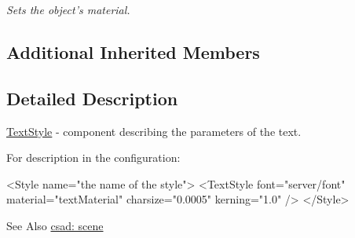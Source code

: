 \begin{DoxyCompactItemize}
\begin{DoxyCompactList}\small\item\em Sets the object's material. \end{DoxyCompactList}\end{DoxyCompactItemize}
\subsection*{Additional Inherited Members}


\subsection{Detailed Description}
\hyperlink{classcsad_1_1_text_style}{Text\-Style} -\/ component describing the parameters of the text. 

For description in the configuration\-: \begin{DoxyVerb}  <Style name="the name of the style">
     <TextStyle font="server/font" material="textMaterial" charsize="0.0005" kerning="1.0" />
  </Style>
\end{DoxyVerb}


\begin{DoxySeeAlso}{See Also}
\hyperlink{group__scene}{csad\-: scene} 
\end{DoxySeeAlso}


